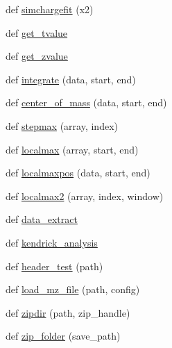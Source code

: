 \begin{DoxyCompactItemize}
\item 
def \hyperlink{namespace_uni_dec_1_1unidec__modules_1_1unidectools_a7d64edcaa7a87c96ba8f9b3ecbd94dac}{simchargefit} (x2)
\item 
def \hyperlink{namespace_uni_dec_1_1unidec__modules_1_1unidectools_ada50305774a5481f4e3198f7f0aad9ff}{get\+\_\+tvalue}
\item 
def \hyperlink{namespace_uni_dec_1_1unidec__modules_1_1unidectools_acf3ac8b1bce0bed7ecd3bd1bc6221fbe}{get\+\_\+zvalue}
\item 
def \hyperlink{namespace_uni_dec_1_1unidec__modules_1_1unidectools_a1aef6306f6859a0c072307f5d5ba2eac}{integrate} (data, start, end)
\item 
def \hyperlink{namespace_uni_dec_1_1unidec__modules_1_1unidectools_a38e7c269c0defeaba523b587f858746d}{center\+\_\+of\+\_\+mass} (data, start, end)
\item 
def \hyperlink{namespace_uni_dec_1_1unidec__modules_1_1unidectools_a1086320e30d8e3878d620f7a76501c5e}{stepmax} (array, index)
\item 
def \hyperlink{namespace_uni_dec_1_1unidec__modules_1_1unidectools_a845d05d10f0dcd45a75adb0f775739a1}{localmax} (array, start, end)
\item 
def \hyperlink{namespace_uni_dec_1_1unidec__modules_1_1unidectools_a457ab122ec9601016ab45c6e8f29f477}{localmaxpos} (data, start, end)
\item 
def \hyperlink{namespace_uni_dec_1_1unidec__modules_1_1unidectools_a3d86f7d9c05e0f5571129a5ba277d061}{localmax2} (array, index, window)
\item 
def \hyperlink{namespace_uni_dec_1_1unidec__modules_1_1unidectools_ac256b67f96b0a1a4751b456e90e3f94b}{data\+\_\+extract}
\item 
def \hyperlink{namespace_uni_dec_1_1unidec__modules_1_1unidectools_a5730098b5fa8a16119155ee947e0d998}{kendrick\+\_\+analysis}
\item 
def \hyperlink{namespace_uni_dec_1_1unidec__modules_1_1unidectools_afe8dbcb3b651deb9e9ee8823b4ce4579}{header\+\_\+test} (path)
\item 
def \hyperlink{namespace_uni_dec_1_1unidec__modules_1_1unidectools_ad00d282a7ac8712a0952405a42e0b839}{load\+\_\+mz\+\_\+file} (path, config)
\item 
def \hyperlink{namespace_uni_dec_1_1unidec__modules_1_1unidectools_a1468a674d13ef076422d69e0f5c341d8}{zipdir} (path, zip\+\_\+handle)
\item 
def \hyperlink{namespace_uni_dec_1_1unidec__modules_1_1unidectools_a6e2e8f26d54eb60ff0b5d9cd6df5d021}{zip\+\_\+folder} (save\+\_\+path)

\end{DoxyCompactItemize}
